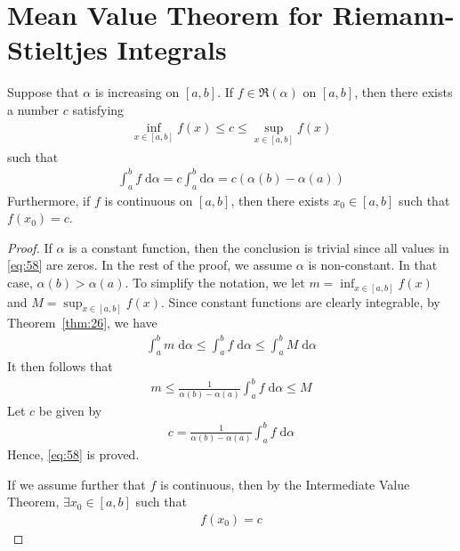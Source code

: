 \documentclass[thmcnt=section, 12pt]{elegantbook}
\begin{document}

\section{Mean Value Theorem for Riemann-Stieltjes Integrals}


\begin{theorem} \label{thm:27}
    Suppose that $\alpha$ is increasing on $[a, b]$. If $f \in \mathfrak{R}(\alpha)$ on $[a, b]$, then there exists a number $c$ satisfying
    \begin{align*}
        \inf_{x \in [a, b]} f(x) \leq c \leq \sup_{x \in [a, b]} f (x)
    \end{align*}
    such that 
    \begin{align}
        \int_a^b f \; \mathrm{d}\alpha
        = c \int_{a}^{b} \mathrm{d}\alpha
        = c( \alpha(b) - \alpha(a) )
        \label{eq:58}
    \end{align}
    Furthermore, if $f$ is continuous on $[a, b]$, then there exists $x_0 \in [a, b]$ such that $f(x_0) = c$.
\end{theorem}

\begin{proof}
    If $\alpha$ is a constant function, then the conclusion is trivial since all values in \eqref{eq:58} are zeros. In the rest of the proof, we assume $\alpha$ is non-constant. In that case, $\alpha(b) > \alpha(a)$. To simplify the notation, we let $m = \inf_{x \in [a, b]} f(x)$ and $M = \sup_{x \in [a, b]} f(x)$. Since constant functions are clearly integrable, by Theorem~\ref{thm:26}, we have 
    \begin{align*}
        \int_{a}^{b} m \;\mathrm{d}\alpha
        \leq \int_{a}^{b} f \;\mathrm{d}\alpha
        \leq \int_{a}^{b} M \;\mathrm{d}\alpha
    \end{align*}
    It then follows that 
    \begin{align*}
        m \leq \frac{1}{\alpha(b) - \alpha(a)} \int_{a}^{b} f \; \mathrm{d}\alpha \leq M
    \end{align*}
    Let $c$ be given by 
    \begin{align*}
        c = \frac{1}{\alpha(b) - \alpha(a)} \int_{a}^{b} f \; \mathrm{d}\alpha
    \end{align*}
    Hence, \eqref{eq:58} is proved.

    \par If we assume further that $f$ is continuous, then by the Intermediate Value Theorem, $\exists x_0 \in [a, b]$ such that
    \begin{align*}
        f(x_0) = c
    \end{align*}
\end{proof}
\end{document}

